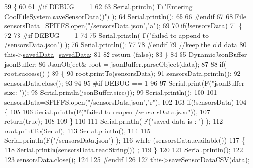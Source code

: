 \begin{DoxyCode}
59 \{
60 
61 \textcolor{preprocessor}{#if DEBUG == 1}
62 
63     Serial.println( F(\textcolor{stringliteral}{"Entering CoolFileSystem.saveSensorData()"}) );
64     Serial.println();
65 
66 \textcolor{preprocessor}{#endif}
67     
68     File sensorsData=SPIFFS.open(\textcolor{stringliteral}{"/sensorsData.json"},\textcolor{stringliteral}{"a"});
69 
70     \textcolor{keywordflow}{if}(!sensorsData)
71     \{
72     
73 \textcolor{preprocessor}{    #if DEBUG == 1}
74     
75         Serial.println( F(\textcolor{stringliteral}{"failed to append to /sensorsData.json"}) );
76         Serial.println();
77     
78 \textcolor{preprocessor}{    #endif}
79         \textcolor{comment}{//keep the old data}
80         this->\hyperlink{class_cool_file_system_ad9f5b739a32100f5f21270c3d9ee2b1d}{savedData}=\hyperlink{class_cool_file_system_ad9f5b739a32100f5f21270c3d9ee2b1d}{savedData};
81 
82         \textcolor{keywordflow}{return} (\textcolor{keyword}{false}); 
83     \}   
84 
85     DynamicJsonBuffer jsonBuffer;
86     JsonObject& root = jsonBuffer.parseObject(data);
87 
88     \textcolor{keywordflow}{if}( root.success() )
89     \{
90         root.printTo(sensorsData);
91         sensorsData.println();
92         sensorsData.close();
93 
94 
95 \textcolor{preprocessor}{    #if DEBUG == 1}
96         
97         Serial.print(F(\textcolor{stringliteral}{"jsonBuffer size: "}));
98         Serial.println(jsonBuffer.size());
99         Serial.println();
100 
101         sensorsData=SPIFFS.open(\textcolor{stringliteral}{"/sensorsData.json"},\textcolor{stringliteral}{"r"});
102         
103         \textcolor{keywordflow}{if}(!sensorsData)
104         \{
105             
106             Serial.println(F(\textcolor{stringliteral}{"failed to reopen /sensorsData.json"}));
107             \textcolor{keywordflow}{return}(\textcolor{keyword}{true});
108                         
109         \}
110     
111         Serial.println( F(\textcolor{stringliteral}{"saved data is : "}) );
112         root.printTo(Serial);
113         Serial.println();
114 
115         Serial.println(F(\textcolor{stringliteral}{"/sensorsData.json"}) );
116         \textcolor{keywordflow}{while} (sensorsData.available()) 
117         \{
118             Serial.println(sensorsData.readString()) ;
119         \}
120         
121         Serial.println();
122         
123         sensorsData.close();
124     
125 \textcolor{preprocessor}{    #endif}
126 
127         this->\hyperlink{class_cool_file_system_ab78704d5d21ce10fc6f1138ab5ab46c8}{saveSensorDataCSV}(data);     

\end{DoxyCode}
